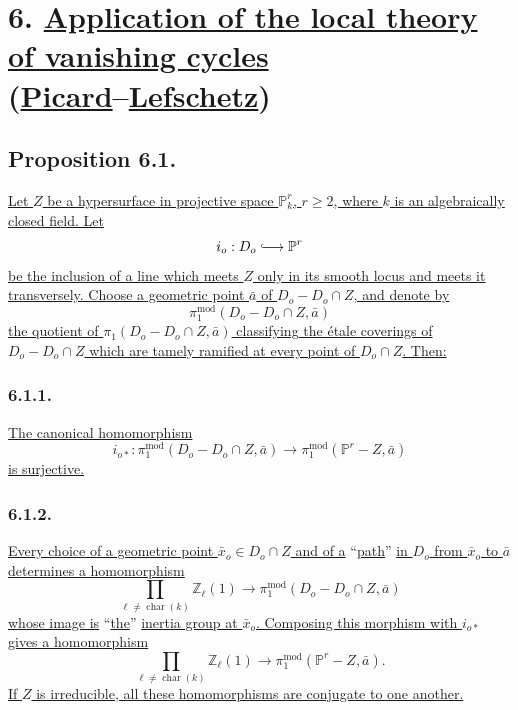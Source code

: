 \section*{6. \underline{Application of the local theory of vanishing cycles}\\
(\underline{Picard}--\underline{Lefschetz})}

\subsection*{Proposition 6.1.}
\underline{Let $Z$ be a hypersurface in projective space $\mathbb P^r_k$,
$r\geq2$, where $k$ is an algebraically closed field.  Let}
\[
i_o:D_o\lhook\joinrel\longrightarrow\mathbb P^r
\]
\underline{be the inclusion of a line which meets $Z$ only in its smooth
locus and meets it transversely.  Choose a geometric point $\bar a$ of
$D_o-D_o\cap Z$, and denote by}
\[
\pi_1^{\mathrm{mod}}(D_o-D_o\cap Z,\bar a)
\]
\underline{the quotient of $\pi_1(D_o-D_o\cap Z,\bar a)$ classifying the
étale coverings of $D_o-D_o\cap Z$ which are tamely ramified at every point
of $D_o\cap Z$.  Then:}

\subsubsection*{6.1.1.}
\underline{The canonical homomorphism}
\begin{equation}\tag{6.1.1.1}
i_{o*}:\pi_1^{\mathrm{mod}}(D_o-D_o\cap Z,\bar a)
\longrightarrow
\pi_1^{\mathrm{mod}}(\mathbb P^r-Z,\bar a)
\end{equation}
\underline{is surjective.}

\subsubsection*{6.1.2.}
\underline{Every choice of a geometric point $\bar x_o\in D_o\cap Z$ and
of a} ``\underline{path}'' \underline{in $D_o$ from $\bar x_o$ to $\bar a$ determines a
homomorphism}
\begin{equation}\tag{6.1.2.1}
\prod_{\ell\ne\operatorname{char}(k)}\mathbb Z_\ell(1)
\longrightarrow
\pi_1^{\mathrm{mod}}(D_o-D_o\cap Z,\bar a)
\end{equation}
\underline{whose image is} ``\underline{the}'' \underline{inertia group at $\bar x_o$.  Composing
this morphism with $i_{o*}$ gives a homomorphism}
\begin{equation}\tag{6.1.2.2}
\prod_{\ell\ne\operatorname{char}(k)}\mathbb Z_\ell(1)
\longrightarrow
\pi_1^{\mathrm{mod}}(\mathbb P^r-Z,\bar a).
\end{equation}
\underline{If $Z$ is irreducible, all these homomorphisms are conjugate to
one another.}

